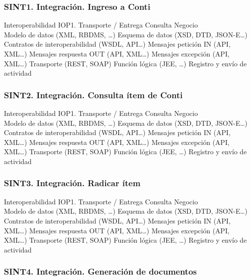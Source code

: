 \documentclass[
  paper=a4,
  ,captions=tableheading
]{scrartcl}
\begin{document}
\hypertarget{sint1.-integraciuxf3n.-ingreso-a-conti}{%
\subsubsection{SINT1. Integración. Ingreso a
Conti}\label{sint1.-integraciuxf3n.-ingreso-a-conti}}

Interoperabilidad IOP1. Transporte / Entrega Consulta Negocio\\
Modelo de datos (XML, RBDMS, \ldots) Esquema de datos (XSD, DTD,
JSON-E\ldots) Contratos de interoperabilidad (WSDL, API\ldots) Mensajes
petición IN (API, XML\ldots) Mensajes respuesta OUT (API, XML\ldots)
Mensajes excepción (API, XML\ldots) Transporte (REST, SOAP) Función
lógica (JEE, \ldots) Registro y envío de actividad

\hypertarget{sint2.-integraciuxf3n.-consulta-uxedtem-de-conti}{%
\subsubsection{SINT2. Integración. Consulta ítem de
Conti}\label{sint2.-integraciuxf3n.-consulta-uxedtem-de-conti}}

Interoperabilidad IOP1. Transporte / Entrega Consulta Negocio\\
Modelo de datos (XML, RBDMS, \ldots) Esquema de datos (XSD, DTD,
JSON-E\ldots) Contratos de interoperabilidad (WSDL, API\ldots) Mensajes
petición IN (API, XML\ldots) Mensajes respuesta OUT (API, XML\ldots)
Mensajes excepción (API, XML\ldots) Transporte (REST, SOAP) Función
lógica (JEE, \ldots) Registro y envío de actividad

\hypertarget{sint3.-integraciuxf3n.-radicar-uxedtem}{%
\subsubsection{SINT3. Integración. Radicar
ítem}\label{sint3.-integraciuxf3n.-radicar-uxedtem}}

Interoperabilidad IOP1. Transporte / Entrega Consulta Negocio\\
Modelo de datos (XML, RBDMS, \ldots) Esquema de datos (XSD, DTD,
JSON-E\ldots) Contratos de interoperabilidad (WSDL, API\ldots) Mensajes
petición IN (API, XML\ldots) Mensajes respuesta OUT (API, XML\ldots)
Mensajes excepción (API, XML\ldots) Transporte (REST, SOAP) Función
lógica (JEE, \ldots) Registro y envío de actividad

\hypertarget{sint4.-integraciuxf3n.-generaciuxf3n-de-documentos}{%
\subsubsection{SINT4. Integración. Generación de
documentos}\label{sint4.-integraciuxf3n.-generaciuxf3n-de-documentos}}
\end{document}
